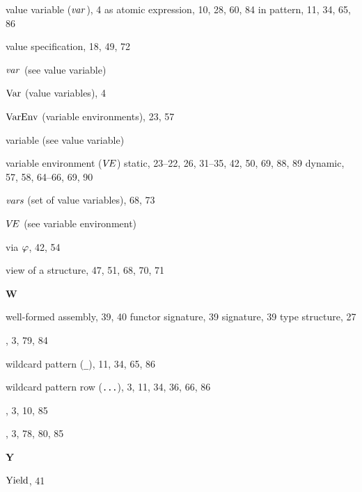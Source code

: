 \begin{theindex}
\item value variable (${\it var}$), 4
\subitem as atomic expression, 10, 28, 60, 84
\subitem in pattern, 11, 34, 65, 86
\item value specification, 18, 49, 72
\item ${\it var}$ (see value variable) 
\item ${\rm Var}$ (value variables), 4
\item ${\rm VarEnv}$ (variable environments), 23, 57
\item variable (see value variable) 
\item variable environment ($\mbox{$V\!E$}$) 
\subitem static, 23--22, 26, 31--35, 42, 50, 69, 88, 89
\subitem dynamic, 57, 58, 64--66, 69, 90
\item $\mbox{\it vars}$ (set of value variables), 68, 73
\item $\mbox{$V\!E$}$ (see variable environment) 
\item via $\varphi$, 42, 54
\item view of a structure, 47, 51, 68, 70, 71
\indexspace
\parbox{65mm}{\hfil{\large\bf W}\hfil}
\indexspace
\item well-formed 
\subitem assembly, 39, 40
\subitem functor signature, 39
\subitem signature, 39
\subitem type structure, 27
\item \WHILE, 3, 79, 84
\item wildcard pattern (\verb+_+), 11, 34, 65, 86
\item wildcard pattern row (\verb+...+), 3, 11, 34, 36, 66, 86
\item \WITH, 3, 10, 85
\item \WITHTYPE, 3, 78, 80, 85
\indexspace
\parbox{65mm}{\hfil{\large\bf Y}\hfil}
\indexspace
\item $\mathop{\rm Yield}\nolimits$, 41
\end{theindex}
